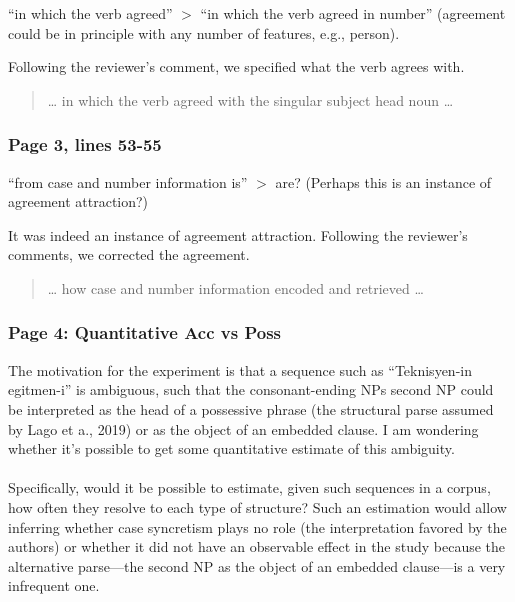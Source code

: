 \documentclass{ar2rc}
\begin{document}
\RC ``in which the verb agreed'' $>$ ``in which the verb agreed in number'' (agreement could be in principle with any number of features, e.g., person).

\AR Following the reviewer's comment, we specified what the verb agrees with.

\begin{quote}
    \ldots{} in which the verb agreed \DIFaddbegin {} \DIFaddend  with the singular subject head noun \ldots
\end{quote}

\subsubsection{Page 3, lines 53-55}

\RC ``from case and number information is'' $>$ are? (Perhaps this is an instance of agreement attraction?)

\AR It was indeed an instance of agreement attraction. Following the reviewer's comments, we corrected the agreement.

\begin{quote}
    \ldots{} how case and number information \DIFaddbegin {} \DIFaddend \DIFdelbegin {} \DIFdelend encoded and retrieved \ldots
\end{quote}

\subsubsection{Page 4: Quantitative Acc vs Poss}

\RC The motivation for the experiment is that a sequence such as ``Teknisyen-in egitmen-i'' is ambiguous, such that the consonant-ending NPs second NP could be interpreted as the head of a possessive phrase (the structural parse assumed by Lago et a., 2019) or as the object of an embedded clause. I am wondering whether it's possible to get some quantitative estimate of this ambiguity.\\\\
Specifically, would it be possible to estimate, given such sequences in a corpus, how often they resolve to each type of structure? Such an estimation would allow inferring whether case syncretism plays no role (the interpretation favored by the authors) or whether it did not have an observable effect in the study because the alternative parse—the second NP as the object of an embedded clause—is a very infrequent one.
\end{document}
